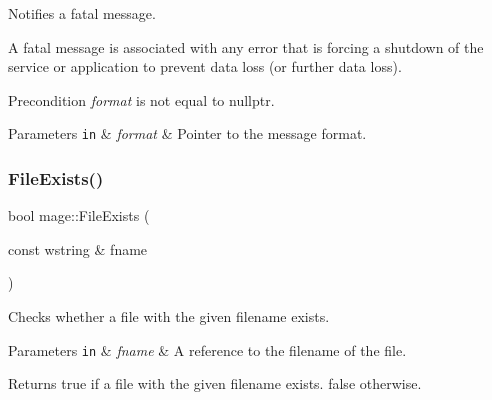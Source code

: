 Notifies a fatal message.

A fatal message is associated with any error that is forcing a shutdown of the service or application to prevent data loss (or further data loss).

\begin{DoxyPrecond}{Precondition}
{\itshape format} is not equal to {\ttfamily nullptr}. 
\end{DoxyPrecond}

\begin{DoxyParams}[1]{Parameters}
\mbox{\tt in}  & {\em format} & Pointer to the message format. \\
\hline
\end{DoxyParams}
\hypertarget{namespacemage_ad5867522908e00fb1b0de3ef8dbe4cff}{}\label{namespacemage_ad5867522908e00fb1b0de3ef8dbe4cff} 
\subsubsection{\texorpdfstring{File\+Exists()}{FileExists()}}
{\footnotesize\ttfamily bool mage\+::\+File\+Exists (\begin{DoxyParamCaption}\item[{const wstring \&}]{fname }\end{DoxyParamCaption})}

Checks whether a file with the given filename exists.


\begin{DoxyParams}[1]{Parameters}
\mbox{\tt in}  & {\em fname} & A reference to the filename of the file. \\
\hline
\end{DoxyParams}
\begin{DoxyReturn}{Returns}
{\ttfamily true} if a file with the given filename exists. {\ttfamily false} otherwise. 
\end{DoxyReturn}
\hypertarget{namespacemage_ac20162a68be6828c38072a3afb0711c1}{}\label{namespacemage_ac20162a68be6828c38072a3afb0711c1} 
